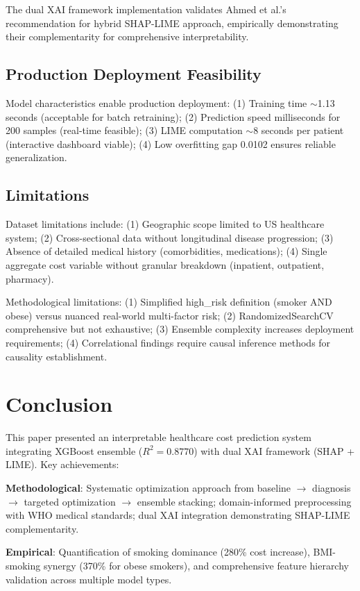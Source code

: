 \documentclass[conference]{IEEEtran}
\begin{document}
The dual XAI framework implementation validates Ahmed et al.'s \cite{ahmed2025} recommendation for hybrid SHAP-LIME approach, empirically demonstrating their complementarity for comprehensive interpretability.

\subsection{Production Deployment Feasibility}
Model characteristics enable production deployment: (1) Training time $\sim$1.13 seconds (acceptable for batch retraining); (2) Prediction speed milliseconds for 200 samples (real-time feasible); (3) LIME computation $\sim$8 seconds per patient (interactive dashboard viable); (4) Low overfitting gap 0.0102 ensures reliable generalization.

\subsection{Limitations}
Dataset limitations include: (1) Geographic scope limited to US healthcare system; (2) Cross-sectional data without longitudinal disease progression; (3) Absence of detailed medical history (comorbidities, medications); (4) Single aggregate cost variable without granular breakdown (inpatient, outpatient, pharmacy).

Methodological limitations: (1) Simplified high\_risk definition (smoker AND obese) versus nuanced real-world multi-factor risk; (2) RandomizedSearchCV comprehensive but not exhaustive; (3) Ensemble complexity increases deployment requirements; (4) Correlational findings require causal inference methods for causality establishment.

\section{Conclusion}
This paper presented an interpretable healthcare cost prediction system integrating XGBoost ensemble ($R^2 = 0.8770$) with dual XAI framework (SHAP + LIME). Key achievements:

\textbf{Methodological}: Systematic optimization approach from baseline $\rightarrow$ diagnosis $\rightarrow$ targeted optimization $\rightarrow$ ensemble stacking; domain-informed preprocessing with WHO medical standards; dual XAI integration demonstrating SHAP-LIME complementarity.

\textbf{Empirical}: Quantification of smoking dominance (280\% cost increase), BMI-smoking synergy (370\% for obese smokers), and comprehensive feature hierarchy validation across multiple model types.
\end{document}
